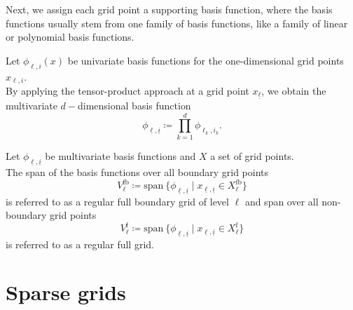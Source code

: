 \documentclass[
  a4paper,  %
  twoside,  %
  bibliography=totoc,
  headsepline,
  cleardoublepage=empty,
  parskip=half,
  draft=false
]{scrbook}
\begin{document}
Next, we assign each grid point a supporting basis function, where the basis functions usually stem from one family of basis functions, like a family of linear or polynomial basis functions.
\begin{definition}
Let $\phi_{\ell,i}(x)$ be univariate basis functions for the one-dimensional grid points $x_{\ell,i}$.\\
By applying the tensor-product approach at a grid point $x_{\underline{\ell}}$, we obtain the multivariate $d-$dimensional basis function
\begin{equation}
\phi_{\underline{\ell},\underline{i}} \coloneqq \prod_{k=1}^{d} \phi_{\ell_k,i_k}.
\label{eq:basis_functions}
\end{equation}
\end{definition}

\begin{definition}
Let $\phi_{\underline{\ell},\underline{i}}$ be multivariate basis functions and $X$ a set of grid points.\\
The span of the basis functions over all boundary grid points
\begin{equation}
V^{\text{fb}}_{\ell} \coloneqq \text{span}~ \{\phi_{\underline{\ell},\underline{i}} \mid x_{\underline{\ell},\underline{i}} \in X^{\text{fb}}_{\ell}\}
\end{equation}
is referred to as a regular full boundary grid of level $\ell$ and span over all non-boundary grid points
\begin{equation}
V^{\text{f}}_{\ell} \coloneqq \text{span}~ \{\phi_{\underline{\ell},\underline{i}} \mid x_{\underline{\ell},\underline{i}} \in X^{\text{f}}_{\ell}\}
\end{equation}
is referred to as a regular full grid.

\label{def:full_grid}
\end{definition}


\section{Sparse grids}
\end{document}
